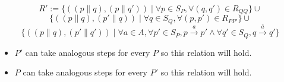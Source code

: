 \documentclass{article}
\begin{document}
$$
R' := 
\{((p \parallel q), (p \parallel q'))\mid \forall p \in S_P, \forall (q,q') \in R_{QQ}\} \cup$$
$$\{((p \parallel q), (p' \parallel q))\mid \forall q \in S_Q, \forall (p,p') \in R_{PP'}\} \cup $$
$$\{ ((p \parallel q), (p' \parallel q')) \mid \forall a \in A, \forall p' \in S_P, p\xrightarrow{a}  p'\wedge \forall q' \in S_Q, q\xrightarrow{\bar{a}} q' \}
$$
\begin{itemize}
	\item[(i)] $P'$ can take analogous steps for every $P$ so this relation will hold.
	\item[(ii)] $P$ can take analogous steps for every $P'$ so this relation will hold.
\end{itemize}

\end{document}
